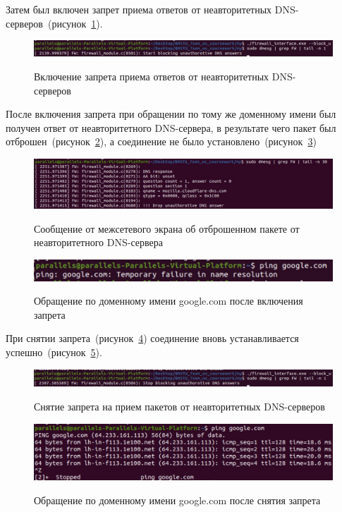 Затем был включен запрет приема ответов от неавторитетных DNS-серверов~(рисунок~\ref{img:u_on}). 

\begin{figure}[h!]
	\begin{center}
		{\includegraphics[scale = 0.2]{inc/img/u_on.jpg}}
		\caption{Включение запрета приема ответов от неавторитетных DNS-серверов}
		\label{img:u_on}
	\end{center}
\end{figure}

После включения запрета при обращении по тому же доменному имени был получен ответ от неавторитетного DNS-сервера, в результате чего пакет был отброшен~(рисунок~\ref{img:u_mess}), а соединение не было установлено~(рисунок~\ref{img:u_middle})


\begin{figure}[h!]
	\begin{center}
		{\includegraphics[scale = 0.35]{inc/img/u_mess.jpg}}
		\caption{Сообщение от межсетевого экрана об отброшенном пакете от неавторитетного DNS-сервера}
		\label{img:u_mess}
	\end{center}
\end{figure}

\clearpage
\begin{figure}[h!]
	\begin{center}
		{\includegraphics[scale = 0.3]{inc/img/u_middle.jpg}}
		\caption{Обращение по доменному имени google.com после включения запрета}
		\label{img:u_middle}
	\end{center}
\end{figure}

При снятии запрета~(рисунок~\ref{img:u_off}) соединение вновь устанавливается успешно~(рисунок~\ref{img:u_after}).  


\begin{figure}[h!]
	\begin{center}
		{\includegraphics[scale = 0.2]{inc/img/u_off.jpg}}
		\caption{Снятие запрета на прием пакетов от неавторитетных DNS-серверов}
		\label{img:u_off}
	\end{center}
\end{figure}


\begin{figure}[h!]
	\begin{center}
		{\includegraphics[scale = 0.35]{inc/img/u_after.jpg}}
		\caption{Обращение по доменному имени google.com после снятия запрета}
		\label{img:u_after}
	\end{center}
\end{figure}
